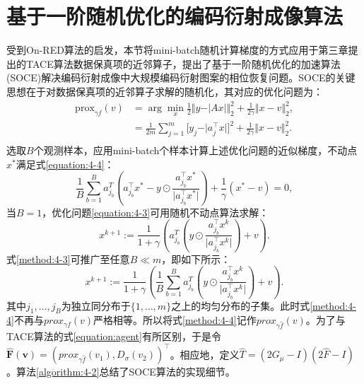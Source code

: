 \section{基于一阶随机优化的编码衍射成像算法}
受到On-RED算法的启发，本节将mini-batch随机计算梯度的方式应用于第三章提出的TACE算法数据保真项的近邻算子，提出了基于一阶随机优化的加速算法(SOCE)解决编码衍射成像中大规模编码衍射图案的相位恢复问题。SOCE的关键思想在于对数据保真项的近邻算子求解的随机化，其对应的优化问题为：
\begin{equation} \label{equation:4-3}
	\begin{aligned}
		\text{prox}_{\gamma{f}}(v)&=\arg\min_{x} \frac{1}{2}{\Vert{y-\vert{Ax}\vert}\Vert_2^2} + \frac{1}{2\gamma}{\Vert{x-v}\Vert_2^2},	\\
		&=\frac{1}{2m}\sum_{j=1}^{m}\big[y_{j}-\vert{a_{j}^\top x}\vert\big]^2+ \frac{1}{2\gamma}{\Vert{x-v}\Vert_2^2}.	\\
	\end{aligned}
\end{equation}
选取$B$个观测样本，应用mini-batch个样本计算上述优化问题的近似梯度，不动点$x^*$满足式\eqref{equation:4-4}：
\begin{equation} \label{equation:4-4}
	\frac{1}{B}\sum_{b=1}^{B}a_{j_b}^\mathit{T}\left({a_{j_b}^\top{x^*}-y\odot\frac{a_{j_b}^\top{x^*}}{\vert{a_{j_b}^\top{x^*}}\vert}}\right) + \frac{1}{\gamma}(x^*-v)=0,
\end{equation}
当$B=1$，优化问题\eqref{equation:4-3}可用随机不动点算法求解：
\begin{equation} \label{method:4-3}
	x^{k+1}:=\frac{1}{1+\gamma}\left(a_{j_b}^\mathit{T}\left({y\odot\frac{a_{j_b}^\top{x^k}}{\vert{a_{j_b}^\top{x^k}}\vert}}\right) + v\right).
\end{equation}
式\eqref{method:4-3}可推广至任意$B\ll{m}$，即如下所示：
\begin{equation} \label{method:4-4}
	x^{k+1}:=\frac{1}{1+\gamma}\left(\frac{1}{B}\sum_{b=1}^{B}a_{j_b}^\mathit{T}\left({y\odot\frac{a_{j_b}^\top{x^k}}{\vert{a_{j_b}^\top{x^k}}\vert}}\right) + v\right).
\end{equation}
其中$j_1,\ldots,j_B$为独立同分布于$\{1,\ldots,m\}$之上的均匀分布的子集。此时式\eqref{method:4-4}不再与$prox_{\gamma{f}}(v)$严格相等。所以将式\eqref{method:4-4}记作$prox_{\gamma{\hat{f}}}(v)$。为了与TACE算法的式\eqref{equation:agent}有所区别，于是令$\mathbf{\hat{F}}(\mathbf{v})=(prox_{\gamma{\hat{f}}}(v_1),D_{\sigma}(v_2))^\top$。相应地，定义$\hat{T}=(2G_{\mu}-I)(2\hat{F}-I)$。算法\ref{algorithm:4-2}总结了SOCE算法的实现细节。
